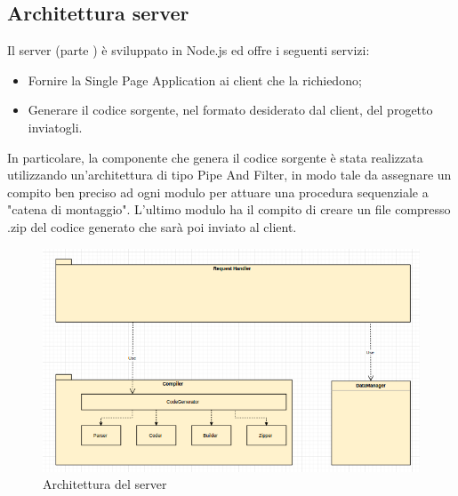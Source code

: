 \documentclass[../PianoDiQualifica.tex]{subfiles}
\begin{document}
		\subsection{Architettura server}
			Il server (parte ) è sviluppato in Node.js ed offre i seguenti servizi:
			\begin{itemize}
				\item Fornire la Single Page Application ai client che la richiedono;
				\item Generare il codice sorgente, nel formato desiderato dal client, del progetto
				inviatogli.
			\end{itemize}
			In particolare, la componente che genera il codice sorgente è stata realizzata utilizzando
			un'architettura di tipo Pipe And Filter, in modo tale da assegnare un compito ben preciso
			ad ogni modulo per attuare una procedura sequenziale a "catena di montaggio". L'ultimo
			modulo ha il compito di creare un file compresso .zip del codice generato che sarà poi
			inviato al client.\\
			\begin{figure}[H]\label{fig:ServerSubsystem}
				\centering
				\includegraphics[scale=0.7]{Immagini/DiagrammaArchitettura/ServerSubsystem.png}
				\caption{Architettura del server}
			\end{figure}
\end{document}
